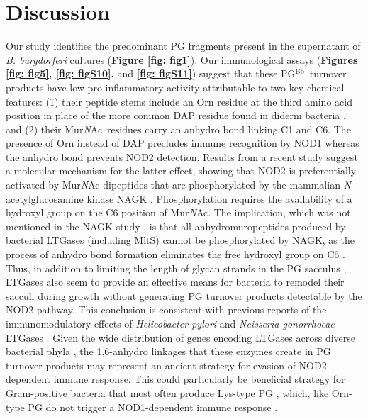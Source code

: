 \documentclass[twoside, watermark]{zHenriquesLab-StyleBioRxiv}
\newcommand{\pgbb}{PG$^\text{Bb}$}
\newcommand{\NAM}{Mur\textit{N}Ac}
\begin{document}
\section*{Discussion}
Our study identifies the predominant PG fragments present in the supernatant of \textit{B. burgdorferi} cultures (\textbf{Figure \ref{fig: fig1}}). Our immunological assays (\textbf{Figures \ref{fig: fig5}, \ref{fig: figS10},} and \textbf{\ref{fig: figS11}}) suggest that these \pgbb~turnover products have low pro-inflammatory activity attributable to two key chemical features: (1) their peptide stems include an Orn residue at the third amino acid position \cite{Beck1990,Jutras2019} in place of the more common DAP residue found in diderm bacteria \cite{Vollmer2008}, and (2) their \NAM~residues carry an anhydro bond linking C1 and C6. The presence of Orn instead of DAP precludes immune recognition by NOD1 \cite{Chamaillard2003,Girardin2003} whereas the anhydro bond prevents NOD2 detection. Results from a recent study suggest a molecular mechanism for the latter effect, showing that NOD2 is preferentially activated by \NAM-dipeptides that are phosphorylated by the mammalian \textit{N}-acetylglucosamine kinase NAGK \cite{Stafford2022}. Phosphorylation requires the availability of a hydroxyl group on the C6 position of \NAM. The implication, which was not mentioned in the NAGK study \cite{Stafford2022}, is that all anhydromuropeptides produced by bacterial LTGases (including MltS) cannot be phosphorylated by NAGK, as the process of anhydro bond formation eliminates the free hydroxyl group on C6 \cite{Dik2017}. Thus, in addition to limiting the length of glycan strands in the PG sacculus \cite{Bohrhunter2021,Holtje1975,Kraft1998,Sassine2021,Yunck2016}, LTGases also seem to provide an effective means for bacteria to remodel their sacculi during growth without generating PG turnover products detectable by the NOD2 pathway. This conclusion is consistent with previous reports of the immunomodulatory effects of \textit{Helicobacter pylori} and \textit{Neisseria gonorrhoeae} LTGases \cite{Chaput2006,Knilans2018}. Given the wide distribution of genes encoding LTGases across diverse bacterial phyla \cite{Dik2017}, the 1,6-anhydro linkages that these enzymes create in PG turnover products may represent an ancient strategy for evasion of NOD2-dependent immune response. This could particularly be beneficial strategy for Gram-positive bacteria that most often produce Lys-type PG \cite{Vollmer2008}, which, like Orn-type PG do not trigger a NOD1-dependent immune response \cite{Chamaillard2003,Girardin2003}.
\end{document}
